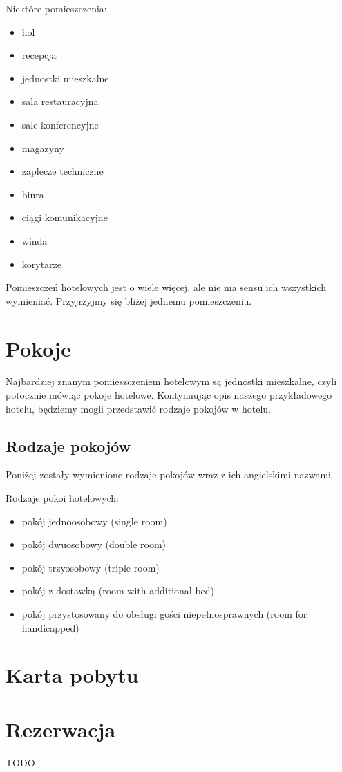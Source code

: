 \documentclass[a4paper,onecolumn,oneside,11pt,wide,floatssmall]{mwrep}
\theoremstyle{definition}
\theoremstyle{plain}%
\theoremstyle{remark}
\begin{document}
Niektóre pomieszczenia:
\begin{itemize}
\item hol
\item recepcja
\item jednostki mieszkalne
\item sala restauracyjna
\item sale konferencyjne
\item magazyny
\item zaplecze techniczne
\item biura
\item ciągi komunikacyjne
\item winda
\item korytarze
\end{itemize}

Pomieszczeń hotelowych jest o wiele więcej, ale nie ma sensu ich wszystkich wymieniać. Przyjrzyjmy się bliżej jednemu pomieszczeniu.

\section{Pokoje}
Najbardziej znanym pomieszczeniem hotelowym są jednostki mieszkalne, czyli potocznie mówiąc pokoje hotelowe. Kontynuując opis naszego przykładowego hotelu, będziemy mogli przedstawić rodzaje pokojów w hotelu.

\subsection{Rodzaje pokojów}
Poniżej zostały wymienione rodzaje pokojów wraz z ich angielskimi nazwami.

Rodzaje pokoi hotelowych:
\begin{itemize}
  \item pokój jednoosobowy (single room)
  \item pokój dwuosobowy (double room)
  \item pokój trzyosobowy (triple room)
  \item pokój z dostawką (room with additional bed)
  \item pokój przystosowany do obsługi gości niepełnosprawnych (room for handicapped)
\end{itemize}

\section{Karta pobytu}

\section{Rezerwacja}
TODO
\end{document}
